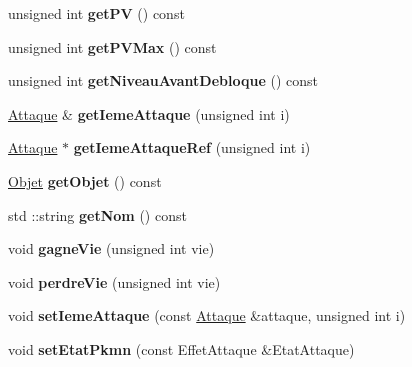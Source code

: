\begin{DoxyCompactItemize}
\mbox{\label{class_pokemon_a97e2f2b4b811d5e2bbcb038fb70f57ce}} 
unsigned int {\bfseries get\+PV} () const
\item 
\mbox{\label{class_pokemon_af11b525fb21bb7fbb86c43d1ddad738a}} 
unsigned int {\bfseries get\+P\+V\+Max} () const
\item 
\mbox{\label{class_pokemon_a84a91b991611246fa387ede48e18d357}} 
unsigned int {\bfseries get\+Niveau\+Avant\+Debloque} () const
\item 
\mbox{\label{class_pokemon_aad16e1f997ee22fe4f0ec385c5bdbc55}} 
\hyperlink{class_attaque}{Attaque} \& {\bfseries get\+Ieme\+Attaque} (unsigned int i)
\item 
\mbox{\label{class_pokemon_a5688276dbf96174ceccec44d416f2df6}} 
\hyperlink{class_attaque}{Attaque} $\ast$ {\bfseries get\+Ieme\+Attaque\+Ref} (unsigned int i)
\item 
\mbox{\label{class_pokemon_a2b83e01a26b1a5fb4e16ffcdc995399a}} 
\hyperlink{class_objet}{Objet} {\bfseries get\+Objet} () const
\item 
\mbox{\label{class_pokemon_aca789a69b00c4e4189571507539bbc30}} 
std \+::string {\bfseries get\+Nom} () const
\item 
\mbox{\label{class_pokemon_ac5ce7b3dd6a431cbc5d73c27e4aeac36}} 
void {\bfseries gagne\+Vie} (unsigned int vie)
\item 
\mbox{\label{class_pokemon_aa036561ffd7e31e668b37785e88a8c51}} 
void {\bfseries perdre\+Vie} (unsigned int vie)
\item 
\mbox{\label{class_pokemon_a52226bbf55f0721dcc143061aeaffd5c}} 
void {\bfseries set\+Ieme\+Attaque} (const \hyperlink{class_attaque}{Attaque} \&attaque, unsigned int i)
\item 
\mbox{\label{class_pokemon_a5c4ce5755e9f91fe545f8e66b8503cd4}} 
void {\bfseries set\+Etat\+Pkmn} (const Effet\+Attaque \&Etat\+Attaque)
\item 

\end{DoxyCompactItemize}
